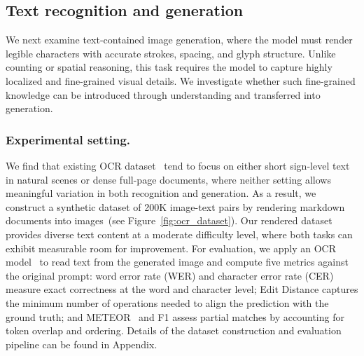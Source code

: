 
\subsection{Text recognition and generation}
\label{subsec:ocr}






We next examine text-contained image generation, where the model must render legible characters with accurate strokes, spacing, and glyph structure. Unlike counting or spatial reasoning, this task requires the model to capture highly localized and fine-grained visual details. We investigate whether such fine-grained knowledge can be introduced through understanding and transferred into generation.


\subsubsection{Experimental setting.} We find that existing OCR dataset~\cite{nemotron_dataset} tend to focus on either short sign-level text in natural scenes or dense full-page documents, where neither setting allows meaningful variation in both recognition and generation. As a result, we construct a synthetic dataset of 200K image-text pairs by rendering markdown documents into images~(see Figure~\ref{fig:ocr_dataset}). Our rendered dataset provides diverse text content at a moderate difficulty level, where both tasks can exhibit measurable room for improvement. For evaluation, we apply an OCR model~\cite{glm_ocr} to read text from the generated image and compute five metrics against the original prompt: word error rate (WER) and character error rate (CER) measure exact correctness at the word and character level; Edit Distance captures the minimum number of operations needed to align the prediction with the ground truth; and METEOR~\cite{banerjee2005meteor} and F1 assess partial matches by accounting for token overlap and ordering. Details of the dataset construction and evaluation pipeline can be found in Appendix.

